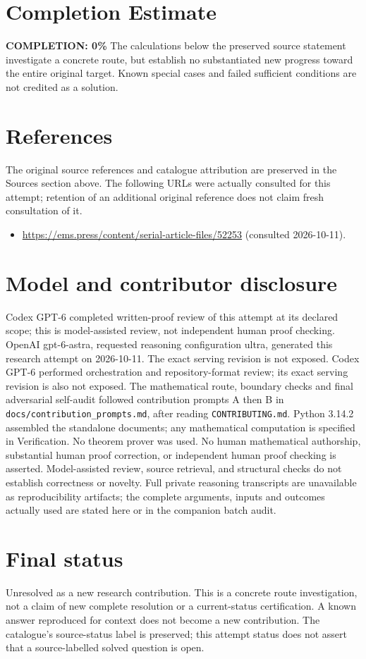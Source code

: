 \documentclass[11pt]{article}
\begin{document}
\section{Completion Estimate}
\noindent\textbf{COMPLETION: 0\%}
The calculations below the preserved source statement investigate a concrete route,
but establish no substantiated new progress toward the entire original target.
Known special cases and failed sufficient conditions are not credited as a solution.
\section{References}
The original source references and catalogue attribution are preserved in the
Sources section above. The following URLs were actually consulted for this attempt;
retention of an additional original reference does not claim fresh consultation of it.
\begin{itemize}
\item \url{https://ems.press/content/serial-article-files/52253} (consulted 2026-10-11). 
\end{itemize}
\section{Model and contributor disclosure}
Codex GPT-6 completed written-proof review of this attempt at its declared scope; this is model-assisted review, not independent human proof checking.
OpenAI gpt-6-astra, requested reasoning configuration ultra, generated this research
attempt on 2026-10-11. The exact serving revision is not exposed. Codex GPT-6
performed orchestration and repository-format review; its exact serving revision
is also not exposed. The mathematical route, boundary checks and final adversarial
self-audit followed contribution prompts A then B in
\texttt{docs/contribution\_prompts.md}, after reading \texttt{CONTRIBUTING.md}.
Python 3.14.2 assembled the standalone documents; any mathematical computation is
specified in Verification. No theorem prover was used. No human mathematical
authorship, substantial human proof correction, or independent human proof checking
is asserted. Model-assisted review, source retrieval, and structural checks do not
establish correctness or novelty. Full private reasoning transcripts are unavailable
as reproducibility artifacts; the complete arguments, inputs and outcomes actually
used are stated here or in the companion batch audit.
\section{Final status}
Unresolved as a new research contribution. This is a concrete route investigation,
not a claim of new complete resolution or a current-status certification. A known
answer reproduced for context does not become a new contribution. The catalogue's
source-status label is preserved; this attempt status does not assert that a
source-labelled solved question is open.
\end{document}

